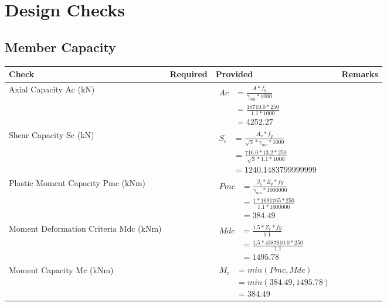 \documentclass{article}%
\begin{document}
%
%
\newpage%
\section{Design Checks}%
\label{sec:DesignChecks}%
\subsection{Member Capacity}%
\label{subsec:MemberCapacity}%
\renewcommand{\arraystretch}{1.2}%
\begin{longtable}{|p{4cm}|p{5cm}|p{5.5cm}|p{1.5cm}|}%
\hline%
\rowcolor{OsdagGreen}%
Check&Required&Provided&Remarks\\%
\hline%
\endhead%
\hline%
Axial Capacity Ac (kN)&&$\begin{aligned} Ac &=\frac{A*f_y}{\gamma_{m0} *1000}\\ &=\frac{18710.0*250}{1.1* 1000}\\ &=4252.27\end{aligned}$&\\%
\hline%
Shear Capacity Sc (kN)&&$\begin{aligned} S_c &= \frac{A_v*f_y}{\sqrt{3}*\gamma_{mo} *1000}\\ &=\frac{716.0*13.2*250}{\sqrt{3}*1.1 *1000}\\ &=1240.1483799999999\end{aligned}$&\\%
\hline%
Plastic Moment Capacity Pmc (kNm)&&$\begin{aligned} Pmc &= \frac{\beta_b * Z_p *fy}{\gamma_{mo} * 1000000}\\ &=\frac{1*1691765*250}{1.1 * 1000000}\\ &=384.49\end{aligned}$&\\%
\hline%
Moment Deformation Criteria Mdc (kNm)&&$\begin{aligned} Mdc &= \frac{1.5 *Z_e *fy}{1.1}\\ &= \frac{1.5 *4387610.0*250}{1.1}\\ &= 1495.78\end{aligned}$&\\%
\hline%
Moment Capacity Mc (kNm)&&$\begin{aligned} M_c &= min(Pmc,Mdc)\\ &=min(384.49,1495.78)\\ &=384.49\end{aligned}$&\\%
\hline%
\end{longtable}
\end{document}
